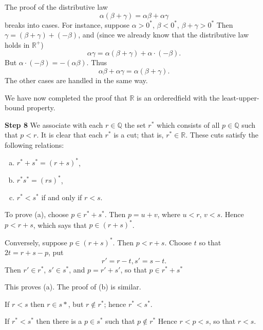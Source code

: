 The proof of the distributive law
\begin{equation*}
    \alpha(\beta + \gamma) = \alpha\beta + \alpha\gamma
\end{equation*}
breaks into cases. For instance, suppose $\alpha> 0^*$, $\beta <0^*$, $\beta + \gamma > 0^*$ Then $\gamma = (\beta + \gamma) + (- \beta)$, and (since we already know that the distributive law holds in $\mathbb{R}^+$)
\begin{equation*}
    \alpha\gamma = \alpha(\beta+\gamma) + \alpha \cdot (-\beta).
\end{equation*}
But $\alpha \cdot (-\beta) = -(\alpha\beta)$. Thus
\begin{equation*}
    \alpha\beta + \alpha\gamma = \alpha(\beta + \gamma).
\end{equation*}
The other cases are handled in the same way.

We have now completed the proof that $\mathbb{R}$ is an orderedfield with the least-upper-bound property.

\textbf{Step 8} 
We associate with each $r\in \mathbb{Q}$ the set $r^*$ 
which consists of all $p \in \mathbb{Q}$ such that $p < r$. 
It is clear that each $r^*$ is a cut; 
that is, $r^* \in \mathbb{R}$. 
These cuts satisfy the following relations:
\begin{enumerate}[(a)]
    \item $r^* + s^* = (r+s)^*$,
    \item $r^* s^* = (rs)^*$,
    \item $r^* < s^*$ if and only if $r < s$.
\end{enumerate}

To prove (a), choose $p \in r^* + s^*$. Then $p=u+v$, where $u<r$, $v<s$.
Hence $p < r +s$, which says that $p \in (r + s)^*$.

Conversely, suppose $p \in (r+s)^*$. Then $p < r + s$. Choose $t$ so that
$2t = r + s - p$, put
\begin{equation*}
    r' = r - t, 
    s' = s - t.
\end{equation*}
Then $r' \in r^*$, $s' \in s^*$, and $p = r' + s'$, so that $p \in r^* + s^*$

This proves (a). The proof of (b) is similar.

If $r < s$ then $r \in s*$, but $r \not\in r^*$; hence $r^* < s^*$.

If $r^* <s^*$ then there is a $p \in s^*$ such that $p \not\in r^*$ Hence $r < p < s$, so that $r < s$.

